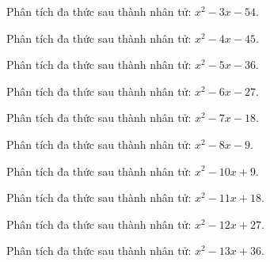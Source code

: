 \begin{bt}
	Phân tích đa thức sau thành nhân tử: $x^2 - 3 x - 54$.
\end{bt}
\begin{bt}
	Phân tích đa thức sau thành nhân tử: $x^2 - 4 x - 45$.
\end{bt}
\begin{bt}
	Phân tích đa thức sau thành nhân tử: $x^2 - 5 x - 36$.
\end{bt}
\begin{bt}
	Phân tích đa thức sau thành nhân tử: $x^2 - 6 x - 27$.
\end{bt}
\begin{bt}
	Phân tích đa thức sau thành nhân tử: $x^2 - 7 x - 18$.
\end{bt}
\begin{bt}
	Phân tích đa thức sau thành nhân tử: $x^2 - 8 x - 9$.
\end{bt}
\begin{bt}
	Phân tích đa thức sau thành nhân tử: $x^2 - 10 x + 9$.
\end{bt}
\begin{bt}
	Phân tích đa thức sau thành nhân tử: $x^2 - 11 x + 18$.
\end{bt}
\begin{bt}
	Phân tích đa thức sau thành nhân tử: $x^2 - 12 x + 27$.
\end{bt}
\begin{bt}
	Phân tích đa thức sau thành nhân tử: $x^2 - 13 x + 36$.
\end{bt}

